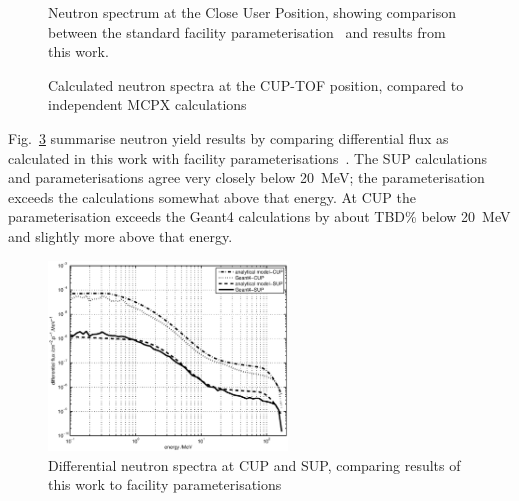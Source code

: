 \documentclass[11pt,a4paper]{IEEEtran}
\let\MYoriglatexcaption\caption
\renewcommand{\caption}[2][\relax]{\MYoriglatexcaption[#2]{#2}}
\begin{document}
\begin{figure}[t]
    \begin{minipage}{\columnwidth}
    \end{minipage}
    \begin{minipage}{\columnwidth}
    \end{minipage}
	\caption{
        Neutron spectrum at the Close User Position, showing comparison between the standard facility parameterisation~\cite{Prokofiev2009} and results from this work.
    }
	\label{fig:CUPSpectraComparison}
\end{figure}

\begin{figure}[t]
    \caption{
        Calculated neutron spectra at the CUP-TOF position, compared to independent MCPX calculations~\cite{Prokofiev14}
    }
    \label{fig:MCComparison}
\end{figure}

Fig.~\ref{fig:DifferentialSpectra} summarise neutron yield results by comparing differential flux as calculated in this work with facility parameterisations~\cite{Prokofiev2009,Prokofiev14}.
The SUP calculations and parameterisations agree very closely below \SI{20}{\MeV}; the parameterisation exceeds the calculations somewhat above that energy.
At CUP the parameterisation exceeds the Geant4 calculations by about TBD\% below \SI{20}{\MeV} and slightly more above that energy.

\begin{figure}[t]
    \centering
    \includegraphics[width=2.5in]{DiffYieldComparedSUPCUP10.eps}
    \caption{
        Differential neutron spectra at CUP and SUP, comparing results of this work to facility parameterisations~\cite{Prokofiev2009,Prokofiev14}
    }
    \label{fig:DifferentialSpectra}
\end{figure}
\end{document}
